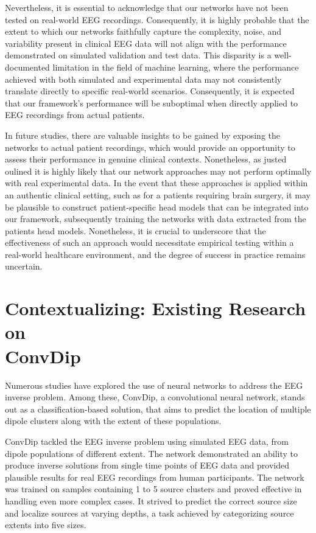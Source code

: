 \documentclass[a4paper, UKenglish, 11pt]{uiomaster}
\begin{document}
Nevertheless, it is essential to acknowledge that our networks have not been tested on real-world EEG recordings. Consequently, it is highly probable that the extent to which our networks faithfully capture the complexity, noise, and variability present in clinical EEG data will not align with the performance demonstrated on simulated validation and test data. This disparity is a well-documented limitation in the field of machine learning, where the performance achieved with both simulated and experimental data may not consistently translate directly to specific real-world scenarios. Consequently, it is expected that our framework's performance will be suboptimal when directly applied to EEG recordings from actual patients.

In future studies, there are valuable insights to be gained by exposing the networks to actual patient recordings, which would provide an opportunity to assess their performance in genuine clinical contexts. Nonetheless, as justed oulined it is highly likely that our network approaches may not perform optimally with real experimental data. In the event that these approaches is applied within an authentic clinical setting, such as for a patients requiring brain surgery, it may be plausible to construct patient-specific head models that can be integrated into our framework, subsequently training the networks with data extracted from the patients head models. Nonetheless, it is crucial to underscore that the effectiveness of such an approach would necessitate empirical testing within a real-world healthcare environment, and the degree of success in practice remains uncertain.


\section{Contextualizing: Existing Research on \\ ConvDip} \label{sec:convdip}
Numerous studies have explored the use of neural networks to address the EEG inverse problem. Among these, ConvDip, a convolutional neural network, stands out as a classification-based solution, that aims to predict the location of multiple dipole clusters along with the extent of these populations.

ConvDip tackled the EEG inverse problem using simulated EEG data, from dipole populations of different extent. The network demonstrated an ability to produce inverse solutions from single time points of EEG data and provided plausible results for real EEG recordings from human participants. The network was trained on samples containing 1 to 5 source clusters and proved effective in handling even more complex cases. It strived to predict the correct source size and localize sources at varying depths, a task achieved by categorizing source extents into five sizes.
\end{document}
